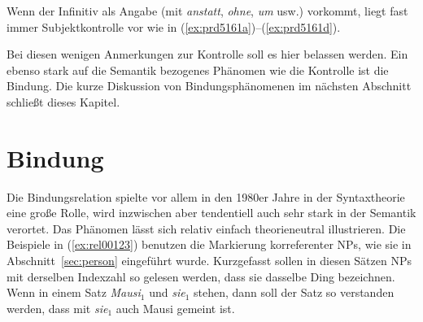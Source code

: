 \begin{exe}
  \ex\label{ex:prd8111} 
  \begin{xlist}
  \end{xlist}
\end{exe}

Wenn der Infinitiv als Angabe (mit \textit{anstatt}, \textit{ohne}, \textit{um} usw.) vorkommt, liegt fast immer Subjektkontrolle vor wie in (\ref{ex:prd5161a})--(\ref{ex:prd5161d}).

\begin{exe}
  \ex\label{ex:prd5161} 
  \begin{xlist}
  \end{xlist}
\end{exe}

Bei diesen wenigen Anmerkungen zur Kontrolle soll es hier belassen werden.
Ein ebenso stark auf die Semantik bezogenes Phänomen wie die Kontrolle ist die Bindung.
Die kurze Diskussion von Bindungsphänomenen im nächsten Abschnitt schließt dieses Kapitel.

\section{Bindung}

\label{sec:bindung}

Die Bindungsrelation spielte vor allem in den 1980er Jahre in der Syntaxtheorie eine große Rolle, wird inzwischen aber tendentiell auch sehr stark in der Semantik verortet.
Das Phänomen lässt sich relativ einfach theorieneutral illustrieren.
Die Beispiele in (\ref{ex:rel00123}) benutzen die Markierung korreferenter NPs, wie sie in Abschnitt~\ref{sec:person} eingeführt wurde.
Kurzgefasst sollen in diesen Sätzen NPs mit derselben Indexzahl so gelesen werden, dass sie dasselbe Ding bezeichnen.
Wenn in einem Satz \textit{Mausi$_1$} und \textit{sie$_1$} stehen, dann soll der Satz so verstanden werden, dass mit \textit{sie$_1$} auch Mausi gemeint ist.

